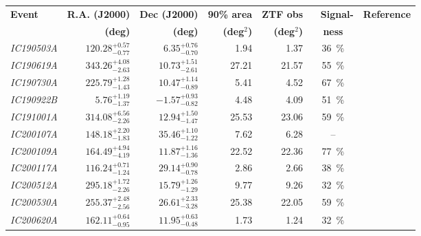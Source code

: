 \appendix

\def\arraystretch{1.5}
\begin{table*}
\centering
\small
    \begin{tabular}{l r r r r c c} 
        \textbf{Event} & \textbf{R.A. (J2000)} & \textbf{Dec (J2000)} & \textbf{90\% area} & \textbf{ZTF obs} &~ \textbf{Signal-}& \textbf{Reference}\\
        & \textbf{(deg)}&\textbf{(deg)}& \textbf{(deg$^{2}$)}& \textbf{(deg$^{2}$)} & \textbf{ness} &\\
        \hline
        \emph{IC190503A} & $120.28^{+0.57}_{-0.77}$ & $6.35^{+0.76}_{-0.70}$ & 1.94 & 1.37 & \SI{36}{\percent}&\cite{IC190503A1, IC190503A2}\\
        \emph{IC190619A} & $343.26^{+4.08}_{-2.63}$ & $10.73^{+1.51}_{-2.61}$ & 27.21 & 21.57 & \SI{55}{\percent}&\cite{IC190619A1, IC190619A2}\\
        \emph{IC190730A} & $225.79^{+1.28}_{-1.43}$ & $10.47^{+1.14}_{-0.89}$ & 5.41 & 4.52 & \SI{67}{\percent}&\cite{IC190730A1, IC190730A2}\\
        \emph{IC190922B} & $5.76^{+1.19}_{-1.37}$ & $-1.57^{+0.93}_{-0.82}$ & 4.48 & 4.09 & \SI{51}{\percent}&\cite{IC190922B1, IC190922B2, IC190922B3}\\
        \emph{IC191001A} & $314.08^{+6.56}_{-2.26}$ & $12.94^{+1.50}_{-1.47}$ & 25.53 & 23.06 & \SI{59}{\percent}& \cite{IC191001A1, IC191001A2, IC191001A3}\\
        \emph{IC200107A} & $148.18^{+2.20}_{-1.83}$ & $35.46^{+1.10}_{-1.22}$ & 7.62 & 6.28 & -- &\cite{IC200107A1, IC200107A2}\\
        \emph{IC200109A} & $164.49^{+4.94}_{-4.19}$ & $11.87^{+1.16}_{-1.36}$ & 22.52 & 22.36 & \SI{77}{\percent}&\cite{IC200109A1, IC200109A2}\\
        \emph{IC200117A} & $116.24^{+0.71}_{-1.24}$ & $29.14^{+0.90}_{-0.78}$ & 2.86 &  2.66 & \SI{38}{\percent}&\cite{IC200117A1, IC200117A2, IC200117A3}\\
        \emph{IC200512A} & $295.18^{+1.72}_{-2.26}$ & $15.79^{+1.26}_{-1.29}$ & 9.77 &  9.26 & \SI{32}{\percent}&\cite{IC200512A1, IC200512A2}\\
        \emph{IC200530A} & $255.37^{+2.48}_{-2.56}$ & $26.61^{+2.33}_{-3.28}$ & 25.38 & 22.05 & \SI{59}{\percent}&\cite{IC200530A1, IC200530A2, IC200530A3, IC200530A4}\\
        \emph{IC200620A} & $162.11^{+0.64}_{-0.95}$ & $11.95^{+0.63}_{-0.48}$ & 1.73 & 1.24 & \SI{32}{\percent}&\cite{IC200620A1, IC200620A2}\\

\end{tabular}
\end{table*}
